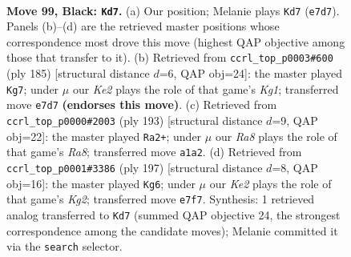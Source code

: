 \documentclass[11pt]{article}
\begin{document}
\clearpage

\begin{figure}[p]\centering
\begin{subfigure}{0.46\textwidth}\centering
\resizebox{\linewidth}{!}{%
\newchessgame
\chessboard[
  setfen={8/4k3/4p2R/8/1R2P3/5PK1/8/r7 b - - 2 99},
  showmover=false,
  pgfstyle=straightmove, color=movearrow, markmove={e7-d7}
]}
\caption{}
\end{subfigure}\hfill
\begin{subfigure}{0.46\textwidth}\centering
\resizebox{\linewidth}{!}{%
\newchessgame
\chessboard[
  setfen={6k1/2R2p2/8/6P1/5PK1/8/r7/8 b - - 4 93},
  showmover=false,
  pgfstyle=straightmove, color=movearrow, markmove={g8-g7}
]}
\caption{}
\end{subfigure}
\\[4pt]
\begin{subfigure}{0.46\textwidth}\centering
\resizebox{\linewidth}{!}{%
\newchessgame
\chessboard[
  setfen={8/5k2/8/2R2p2/5P2/4P3/5K2/r7 b - - 72 97},
  showmover=false,
  pgfstyle=straightmove, color=movearrow, markmove={a1-a2}
]}
\caption{}
\end{subfigure}\hfill
\begin{subfigure}{0.46\textwidth}\centering
\resizebox{\linewidth}{!}{%
\newchessgame
\chessboard[
  setfen={8/6k1/7p/r7/6P1/5PK1/8/7R b - - 8 99},
  showmover=false,
  pgfstyle=straightmove, color=movearrow, markmove={g7-g6}
]}
\caption{}
\end{subfigure}
\caption{\textbf{Move 99, Black: \texttt{Kd7}.} (a) Our position; Melanie plays \texttt{Kd7} (\texttt{e7d7}). Panels (b)--(d) are the retrieved master positions whose correspondence most drove this move (highest QAP objective among those that transfer to it). (b) Retrieved from \texttt{ccrl\_top\_p0003\#600} (ply 185) [structural distance $d$=6, QAP obj=24]: the master played \texttt{Kg7}; under $\mu$ our \emph{Ke2} plays the role of that game's \emph{Kg1}; transferred move \texttt{e7d7} \textbf{(endorses this move)}. (c) Retrieved from \texttt{ccrl\_top\_p0000\#2003} (ply 193) [structural distance $d$=9, QAP obj=22]: the master played \texttt{Ra2+}; under $\mu$ our \emph{Ra8} plays the role of that game's \emph{Ra8}; transferred move \texttt{a1a2}. (d) Retrieved from \texttt{ccrl\_top\_p0001\#3386} (ply 197) [structural distance $d$=8, QAP obj=16]: the master played \texttt{Kg6}; under $\mu$ our \emph{Ke2} plays the role of that game's \emph{Kg2}; transferred move \texttt{e7f7}. Synthesis: 1 retrieved analog transferred to \texttt{Kd7} (summed QAP objective 24, the strongest correspondence among the candidate moves); Melanie committed it via the \texttt{search} selector.}
\label{fig:thought-m197}
\end{figure}
\end{document}
